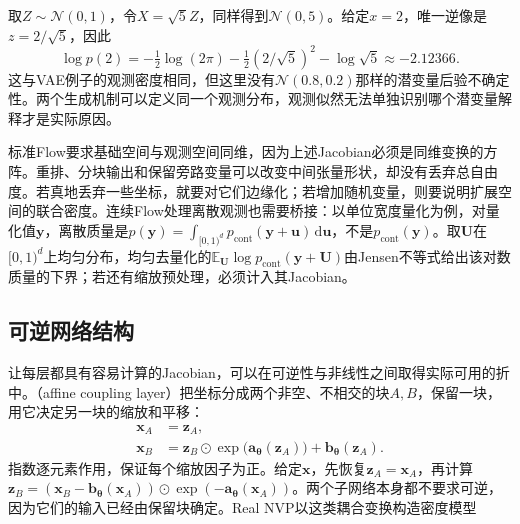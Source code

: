 \begin{example}[用缩放得到相同的一维密度]
  \label{ex:pgm-generative-gaussian-flow}
  取$Z\sim\mathcal{N}(0,1)$，令$X=\sqrt{5}Z$，同样得到$\mathcal{N}(0,5)$。给定$x=2$，唯一逆像是$z=2/\sqrt5$，因此
  \[
    \log p(2)=-\tfrac12\log(2\pi)
              -\tfrac12(2/\sqrt5)^2-\log\sqrt5
             \approx-2.12366.
  \]
  这与VAE例子的观测密度相同，但这里没有$\mathcal{N}(0.8,0.2)$那样的潜变量后验不确定性。两个生成机制可以定义同一个观测分布，观测似然无法单独识别哪个潜变量解释才是实际原因。
\end{example}

标准Flow要求基础空间与观测空间同维，因为上述Jacobian必须是同维变换的方阵。重排、分块输出和保留旁路变量可以改变中间张量形状，却没有丢弃总自由度。若真地丢弃一些坐标，就要对它们边缘化；若增加随机变量，则要说明扩展空间的联合密度。连续Flow处理离散观测也需要桥接：以单位宽度量化为例，对量化值$\bm{y}$，离散质量是$p(\bm{y})=\int_{[0,1)^d}p_{\mathrm{cont}}(\bm{y}+\bm{u})\,\mathrm{d}\bm{u}$，不是$p_{\mathrm{cont}}(\bm{y})$。取$\bm{U}$在$[0,1)^d$上均匀分布，均匀去量化的$\mathbb{E}_{\bm{U}}\log p_{\mathrm{cont}}(\bm{y}+\bm{U})$由Jensen不等式给出该对数质量的下界；若还有缩放预处理，必须计入其Jacobian。

\subsection{可逆网络结构}
\label{sec:pgm-generative-invertible-networks}

让每层都具有容易计算的Jacobian，可以在可逆性与非线性之间取得实际可用的折中。（affine coupling layer）把坐标分成两个非空、不相交的块$A,B$，保留一块，用它决定另一块的缩放和平移：
\begin{equation}
  \label{eq:pgm-generative-coupling}
  \begin{aligned}
    \bm{x}_A&=\bm{z}_A,\\
    \bm{x}_B&=\bm{z}_B\odot
       \exp\bigl(\bm{a}_{\bm{\theta}}(\bm{z}_A)\bigr)
          +\bm{b}_{\bm{\theta}}(\bm{z}_A).
  \end{aligned}
\end{equation}
指数逐元素作用，保证每个缩放因子为正。给定$\bm{x}$，先恢复$\bm{z}_A=\bm{x}_A$，再计算$\bm{z}_B=(\bm{x}_B-\bm{b}_{\bm{\theta}}(\bm{x}_A))\odot\exp(-\bm{a}_{\bm{\theta}}(\bm{x}_A))$。两个子网络本身都不要求可逆，因为它们的输入已经由保留块确定。Real NVP以这类耦合变换构造密度模型

